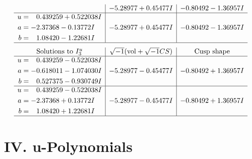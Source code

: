 \documentclass[1p]{elsarticle_modified}
\theoremstyle{definition}
\newcommand{\I}{\sqrt{-1}}
\begin{document}
$$\begin{array}{c|c|c}
 & -5.28977 + 0.45477 I & -0.80492 - 1.36957 I \\ \hline\begin{aligned}
u &= \phantom{-}0.439259 + 0.522038 I \\
a &= -2.37368 - 0.13772 I \\
b &= \phantom{-}1.08420 - 1.22681 I\end{aligned}
 & -5.28977 + 0.45477 I & -0.80492 - 1.36957 I\\
 \hline 
 \end{array}$$\newpage$$\begin{array}{c|c|c}  
\text{Solutions to }I^u_{3}& \I (\text{vol} + \sqrt{-1}CS) & \text{Cusp shape}\\
 \hline 
\begin{aligned}
u &= \phantom{-}0.439259 - 0.522038 I \\
a &= -0.618011 - 1.074030 I \\
b &= \phantom{-}0.527375 - 0.930749 I\end{aligned}
 & -5.28977 - 0.45477 I & -0.80492 + 1.36957 I \\ \hline\begin{aligned}
u &= \phantom{-}0.439259 - 0.522038 I \\
a &= -2.37368 + 0.13772 I \\
b &= \phantom{-}1.08420 + 1.22681 I\end{aligned}
 & -5.28977 - 0.45477 I & -0.80492 + 1.36957 I\\
 \hline 
 \end{array}$$\newpage
\newpage\renewcommand{\arraystretch}{1}
\centering \section*{ IV. u-Polynomials}
\end{document}
